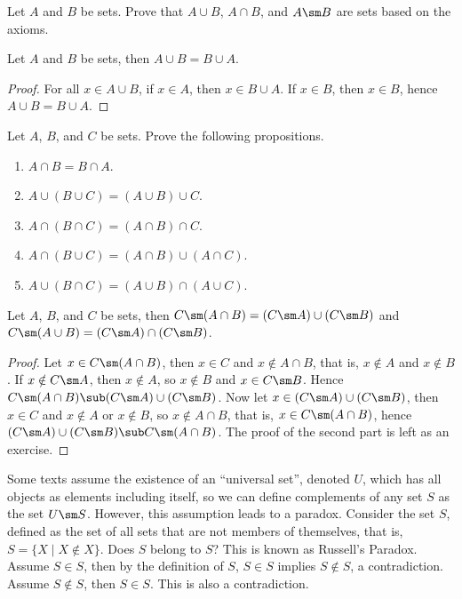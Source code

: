 \documentclass[10pt]{article}
\begin{document}
\begin{problem}
    Let $A$ and $B$ be sets. Prove that $A\cup B$, $A\cap B$, and $A\sm B$ are sets based on the axioms.
\end{problem}
\begin{proposition}
    Let $A$ and $B$ be sets, then $A\cup B=B\cup A$.
\end{proposition}
\begin{proof}
    For all $x\in A\cup B$, if $x\in A$, then $x\in B\cup A$. If $x\in B$, then $x\in B$, hence $A\cup B=B\cup A$.
\end{proof}
\begin{problem}
    Let $A$, $B$, and $C$ be sets. Prove the following propositions.
    \begin{enumerate}
        \item $A\cap B=B\cap A$.
        \item $A\cup(B\cup C)=(A\cup B)\cup C$.
        \item $A\cap(B\cap C)=(A\cap B)\cap C$.
        \item $A\cap(B\cup C)=(A\cap B)\cup(A\cap C)$.
        \item $A\cup(B\cap C)=(A\cup B)\cap(A\cup C)$.
    \end{enumerate}
\end{problem}
\begin{theorem}
    Let $A$, $B$, and $C$ be sets, then $C\sm(A\cap B)=(C\sm A)\cup(C\sm B)$ and $C\sm(A\cup B)=(C\sm A)\cap(C\sm B)$.
\end{theorem}
\begin{proof}
    Let $x\in C\sm(A\cap B)$, then $x\in C$ and $x\notin A\cap B$, that is, $x\notin A$ and $x\notin B$. If $x\notin C\sm A$, then $x\notin A$, so $x\notin B$ and $x\in C\sm B$. Hence $C\sm(A\cap B)\sub(C\sm A)\cup(C\sm B)$. Now let $x\in(C\sm A)\cup(C\sm B)$, then $x\in C$ and $x\notin A$ or $x\notin B$, so $x\notin A\cap B$, that is, $x\in C\sm(A\cap B)$, hence $(C\sm A)\cup(C\sm B)\sub C\sm(A\cap B)$. The proof of the second part is left as an exercise.
\end{proof}
\par
Some texts assume the existence of an ``universal set'', denoted $U$, which has all objects as elements including itself, so we can define complements of any set $S$ as the set $U\sm S$. However, this assumption leads to a paradox. Consider the set $S$, defined as the set of all sets that are not members of themselves, that is, $S=\{X\mid X\notin X\}$. Does $S$ belong to $S$? This is known as Russell's Paradox. Assume $S\in S$, then by the definition of $S$, $S\in S$ implies $S\notin S$, a contradiction. Assume $S\notin S$, then $S\in S$. This is also a contradiction.
\end{document}
